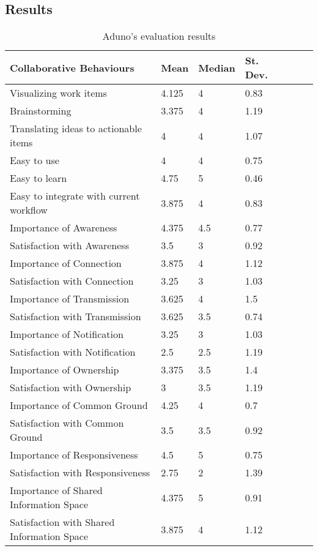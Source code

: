 \documentclass[conference]{IEEEtran}
\begin{document}

\subsection{Results}


\begin{table}[h]
\begin{center}
\begin{tabular}{@{\hspace{.1cm}}llll@{\hspace{0cm}}c@{\hspace{0cm}}c@{\hspace{0cm}}c@{\hspace{.1cm}}}
\hline
Collaborative Behaviours&  Mean&   Median&  St. Dev.&\\
\hline
Visualizing work items& 4.125& 4& 0.83\\
Brainstorming& 3.375& 4& 1.19\\
Translating ideas to actionable items& 4& 4& 1.07\\
Easy to use& 4& 4& 0.75\\
Easy to learn& 4.75& 5& 0.46\\
Easy to integrate with current workflow& 3.875& 4& 0.83\\
\hline
Importance of Awareness& 4.375& 4.5& 0.77\\
Satisfaction with Awareness& 3.5& 3& 0.92\\
\hline
Importance of Connection& 3.875& 4& 1.12\\
Satisfaction with Connection& 3.25& 3& 1.03\\
\hline
Importance of Transmission& 3.625& 4& 1.5\\
Satisfaction with Transmission& 3.625& 3.5& 0.74\\
\hline
Importance of Notification& 3.25& 3& 1.03\\
Satisfaction with Notification& 2.5& 2.5& 1.19\\
\hline
Importance of Ownership& 3.375& 3.5& 1.4\\
Satisfaction with Ownership& 3& 3.5& 1.19\\
\hline
Importance of Common Ground& 4.25& 4& 0.7\\
Satisfaction with Common Ground& 3.5& 3.5& 0.92\\
\hline
Importance of Responsiveness& 4.5& 5& 0.75\\
Satisfaction with Responsiveness& 2.75& 2& 1.39\\
\hline
Importance of Shared Information Space& 4.375& 5& 0.91\\
Satisfaction with Shared Information Space& 3.875& 4& 1.12\\
\hline
\end{tabular}
\end{center}
\caption{Aduno's evaluation results}
\label{tab:surveyresults}
\end{table}
\end{document}
